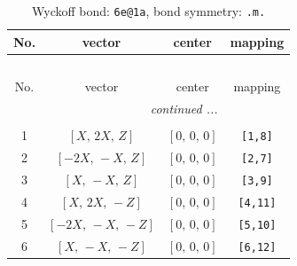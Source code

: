 \documentclass[fleqn,8pt]{jsarticle}
\begin{document}
\renewcommand{\arraystretch}{1.2}
\begin{longtable}{cccc}
\caption{Wyckoff bond: {\tt 6e@1a}, bond symmetry: {\tt .m.}}
 \\
 \hline \hline
No. & vector & center & mapping \\ \hline \endfirsthead

\multicolumn{3}{l}{\tablename\ \thetable{}} \\
 \hline \hline
No. & vector & center & mapping \\ \hline \endhead

 \hline \hline
\multicolumn{3}{r}{\footnotesize\it continued ...} \\ \endfoot

 \hline \hline
\multicolumn{3}{r}{} \\ \endlastfoot

1 & $\left[ X,\, 2 X,\, Z \right]$ & $\left[ 0,\, 0,\, 0 \right]$ & {\tt [1,8]} \\ \hline
2 & $\left[ - 2 X,\, - X,\, Z \right]$ & $\left[ 0,\, 0,\, 0 \right]$ & {\tt [2,7]} \\ \hline
3 & $\left[ X,\, - X,\, Z \right]$ & $\left[ 0,\, 0,\, 0 \right]$ & {\tt [3,9]} \\ \hline
4 & $\left[ X,\, 2 X,\, - Z \right]$ & $\left[ 0,\, 0,\, 0 \right]$ & {\tt [4,11]} \\ \hline
5 & $\left[ - 2 X,\, - X,\, - Z \right]$ & $\left[ 0,\, 0,\, 0 \right]$ & {\tt [5,10]} \\ \hline
6 & $\left[ X,\, - X,\, - Z \right]$ & $\left[ 0,\, 0,\, 0 \right]$ & {\tt [6,12]} \\
\end{longtable}
\renewcommand{\arraystretch}{1.2}
\end{document}
